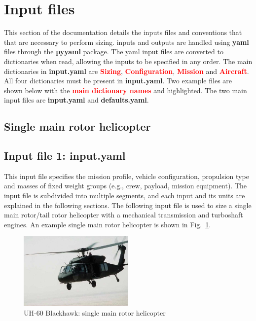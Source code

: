 \section{Input files}
This section of the documentation details the inputs files and conventions that that are necessary to perform sizing. \hydra \spc inputs and outputs are handled using \textbf{yaml} files through the \textbf{pyyaml} package. The yaml input files are converted to \python \spc dictionaries when read, allowing the inputs to be specified in any order. The main dictionaries in \textbf{input.yaml} are \textcolor{red}{\textbf{Sizing}}, \textcolor{red}{\textbf{Configuration}}, \textcolor{red}{\textbf{Mission}} and \textcolor{red}{\textbf{Aircraft}}. All four dictionaries must be present in \textbf{input.yaml}. Two example files are shown below with the \textcolor{red}{\textbf{main dictionary names}} and  highlighted. The two main input files are \textbf{input.yaml} and \textbf{defaults.yaml}.

\subsection{Single main rotor helicopter}
\subsection*{Input file 1: input.yaml}
This input file specifies the mission profile, vehicle configuration, propulsion type and masses of fixed weight groups (e.g., crew, payload, mission equipment). The input file is subdivided into multiple segments, and each input and its units are explained in the following sections. The following input file is used to size a single main rotor/tail rotor helicopter with a mechanical transmission and turboshaft engines. An example single main rotor helicopter is shown in Fig.~\ref{fig:helo}.

\begin{figure}[H]
\begin{center}
\includegraphics[width=0.5\textwidth]{images/uh60_blackhawk.png}
\caption{UH-60 Blackhawk: single main rotor helicopter}
\label{fig:helo}
\end{center}
\end{figure}

